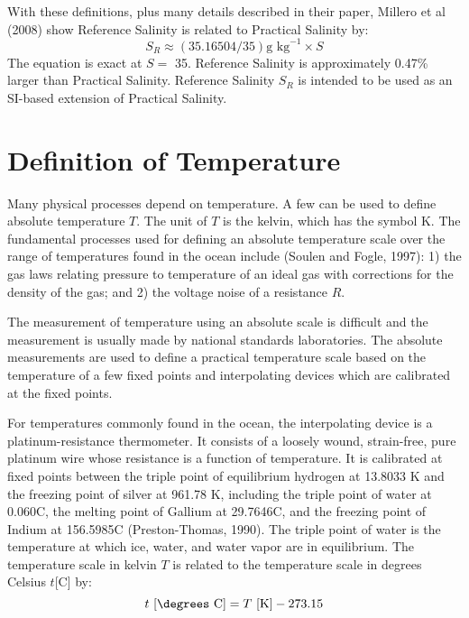 With these definitions, plus many details described in their paper, Millero et al (2008) show Reference Salinity is related to Practical Salinity  by:
\begin{equation}
S_R \approx (35.16504/35) \text{g kg}^{-1} \times S
\end{equation}
The equation is exact at $S = $ 35. Reference Salinity is approximately 0.47\% larger than Practical Salinity. Reference Salinity $S_R$ is intended to be used as an SI-based extension of Practical Salinity.

\section{Definition of Temperature}
Many physical processes depend on temperature. A few can be used to define absolute
temperature $T$. The unit of $T$ is the kelvin, which has the symbol K. The fundamental processes used for defining an absolute temperature scale over the range of temperatures found in the ocean include (Soulen and Fogle, 1997): 1) the gas laws relating pressure to temperature of an ideal gas with corrections for the density of the gas; and 2) the voltage noise of a resistance $R$.

The measurement of temperature using an absolute scale is difficult and the measurement is usually made by national standards laboratories. The absolute measurements are used to define a practical temperature scale based on the temperature of a few fixed points and interpolating devices which are calibrated at the fixed points.

For temperatures commonly found in the ocean, the interpolating device is a platinum-resistance thermometer. It consists of a loosely wound, strain-free, pure platinum wire whose resistance is a function of temperature. It is calibrated at fixed points between the triple point of equilibrium hydrogen at 13.8033 K and the freezing point of silver at 961.78 K, including the triple point of water at 0.060\degrees C, the melting point of Gallium at 29.7646\degrees C, and the freezing point of Indium at 156.5985\degrees C (Preston-Thomas, 1990). The triple point of water is the temperature at which ice, water, and water vapor are in equilibrium. The temperature scale in kelvin $T$ is related to the temperature scale in degrees Celsius $t$[\degrees C] by:
\begin{equation}
t \text{ [\degrees C]} = T \text{ [K]} -273.15
\end{equation}

